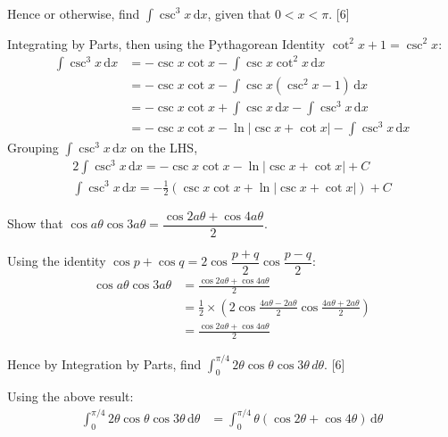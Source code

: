\documentclass[12pt, a4 paper]{article}
\begin{document}
\begin{outline}[enumerate]
\begin{answer}
\begin{align*}
		\end{align*}
	\end{answer}    
	Hence or otherwise, find $\int \csc^3x\,\mathrm{d}x$, given that $0<x<\pi$. \hfill[6]
	\begin{answer}
		Integrating by Parts, then using the Pythagorean Identity $\cot^2 x+1=\csc^2 x$:
		\begin{align*}
			\int \csc^3x\,\mathrm{d}x & = -\csc x \cot x - \int \csc x \cot^2 x \,\mathrm{d}x                   \\
			                          & = -\csc x \cot x - \int \csc x (\csc^2 x -1) \,\mathrm{d}x              \\
			                          & = -\csc x \cot x + \int \csc x\,\mathrm{d}x - \int \csc^3x\,\mathrm{d}x \\
			                          & = -\csc x \cot x - \ln{|\csc x + \cot x|} - \int \csc^3x\,\mathrm{d}x   
		\end{align*}
		Grouping $\int \csc^3x\,\mathrm{d}x$ on the LHS, 
		\begin{align*}
			2\int \csc^3x\,\mathrm{d}x = -\csc x \cot x - \ln{|\csc x + \cot x|} + C             \\
			\int \csc^3x\,\mathrm{d}x = -\frac{1}{2}(\csc x \cot x + \ln{|\csc x + \cot x|}) + C 
		\end{align*}
	\end{answer}
	\1 Show that $\cos{a\theta} \cos{3a\theta} = \dfrac{\cos{2a\theta} + \cos{4a\theta}}{2}$.\\
	\begin{answer}
		Using the identity $\cos p+\cos q=2\cos {\dfrac {p+q}{2}}\cos {\dfrac {p-q}{2}}$:
		\begin{align*}
			\cos{a\theta} \cos{3a\theta} & = \frac{\cos{2a\theta} + \cos{4a\theta}}{2}                                                  \\
			                             & = \frac{1}{2} \times (2 \cos{\frac{4a\theta-2a\theta}{2}} \cos{\frac{4a\theta+2a\theta}{2}}) \\
			                             & = \frac{\cos{2a\theta} + \cos{4a\theta}}{2}                                                  
		\end{align*}
	\end{answer}
	Hence by Integration by Parts, find $\int_0^{\pi/4} 2\theta\cos\theta\cos{3\theta}\,d\theta$. \hfill[6]
	\begin{answer}
		Using the above result:
		\begin{align*}
			\int_0^{\pi/4} 2\theta\cos\theta\cos{3\theta}\,\mathrm{d}\theta & = \int_0^{\pi/4} \theta(\cos{2\theta} + \cos{4\theta})\,\mathrm{d}\theta                                                                                       \\

\end{align*}
\end{answer}
\end{outline}
\end{document}
